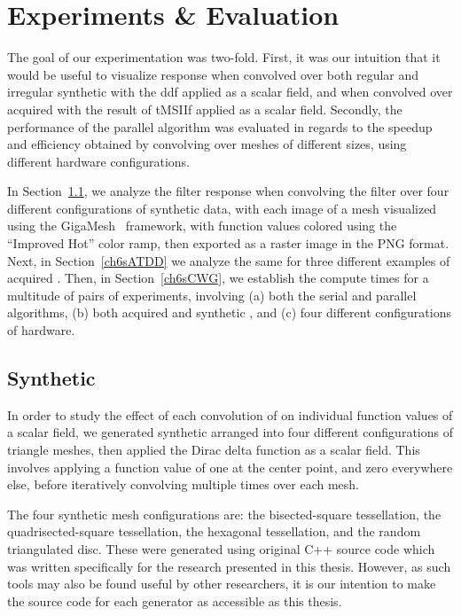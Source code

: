 \chapter{Experiments \& Evaluation}
\label{ch6}
The goal of our experimentation was two-fold. First, it was our intuition that it would be useful to visualize  response when convolved over both regular and irregular synthetic \tdd{} with the \gls{ddf} applied as a scalar field, and when convolved over acquired \tdd{} with the result of \gls{tMSIIf} applied as a scalar field. Secondly, the performance of the parallel algorithm was evaluated in regards to the speedup and efficiency obtained by convolving  over meshes of different sizes, using different hardware configurations.

In Section~\ref{ch6sSTDD}, we analyze the filter response when convolving the filter over four different configurations of synthetic data, with each image of a mesh visualized using the GigaMesh~\cite{Mara10} framework, with function values colored using the ``Improved Hot'' color ramp, then exported as a raster image in the \gls{PNG} format. Next, in Section~\ref{ch6sATDD} we analyze the same for three different examples of acquired \tdd{}. Then, in Section~\ref{ch6sCWG}, we establish the compute times for a multitude of pairs of experiments, involving (a) both the serial and parallel algorithms, (b) both acquired and synthetic \tdd{}, and (c) four different configurations of hardware.

%
%
%
%
%
%
\section{Synthetic \tdd{}}
\label{ch6sSTDD}
In order to study the effect of each convolution of  on individual function values of a scalar field, we generated synthetic \tdd{} arranged into four different configurations of triangle meshes, then applied the Dirac delta function as a scalar field. This involves applying a function value of one at the center point, and zero everywhere else, before iteratively convolving  multiple times over each mesh.

The four synthetic mesh configurations are: the bisected-square tessellation, the quadrisected-square tessellation, the hexagonal tessellation, and the random triangulated disc. These were generated using original C++ source code which was written specifically for the research presented in this thesis. However, as such tools may also be found useful by other researchers, it is our intention to make the source code for each generator as accessible as this thesis.

